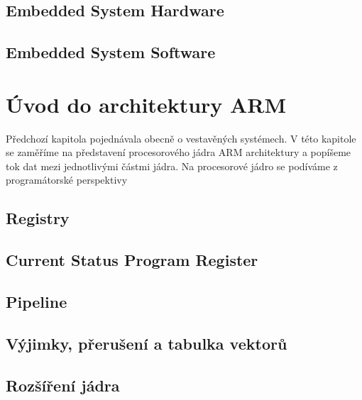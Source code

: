   \subsection{Embedded System Hardware}
  \subsection{Embedded System Software}

\section{Úvod do architektury ARM}
  Předchozí kapitola pojednávala obecně o vestavěných systémech. V této kapitole se zaměříme na 
  představení procesorového jádra ARM architektury a popíšeme tok dat mezi jednotlivými částmi 
  jádra. Na procesorové jádro se podíváme z programátorské perspektivy 
  
  
  \subsection{Registry}
  \subsection{Current Status Program Register}
  \subsection{Pipeline}
  \subsection{Výjimky, přerušení a tabulka vektorů}
  \subsection{Rozšíření jádra}
